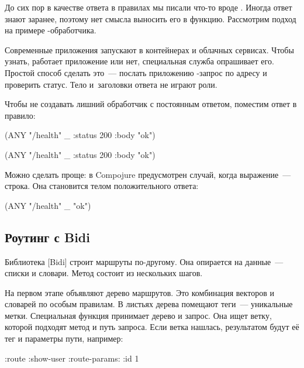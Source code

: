 До сих пор в качестве ответа в правилах мы писали что-то вроде
. Иногда ответ знают заранее, поэтому нет смысла
выносить его в функцию. Рассмотрим подход на примере
-обработчика.

Современные приложения запускают в контейнерах и облачных сервисах. Чтобы
узнать, работает приложение или нет, специальная служба опрашивает его. Простой
способ сделать это~--- послать приложению -запрос по адресу
 и проверить статус. Тело и~заголовки ответа не играют роли.

Чтобы не создавать лишний обработчик  с постоянным ответом,
поместим ответ в правило:


\ifnarrow

\begin{clojure}
(ANY "/health" _
     {:status 200 :body "ok"})
\end{clojure}

\else

\begin{clojure}
(ANY "/health" _ {:status 200 :body "ok"})
\end{clojure}

\fi

Можно сделать проще: в Compojure предусмотрен случай, когда выражение~---
строка. Она становится телом положительного ответа:

\begin{clojure}
(ANY "/health" _ "ok")
\end{clojure}

\subsection{Роутинг с Bidi}


Библиотека [Bidi] строит маршруты
по-другому. Она опирается на данные~--- списки и словари. Метод состоит из
нескольких шагов.

На первом этапе объявляют дерево маршрутов. Это комбинация векторов и словарей
по особым правилам. В листьях дерева помещают теги~--- уникальные
метки. Специальная функция принимает дерево и запрос. Она ищет ветку, которой
подходят метод и путь запроса. Если ветка нашлась, результатом будут её тег и
параметры пути, например:

\begin{clojure}
{:route :show-user :route-params: {:id 1}}
\end{clojure}

